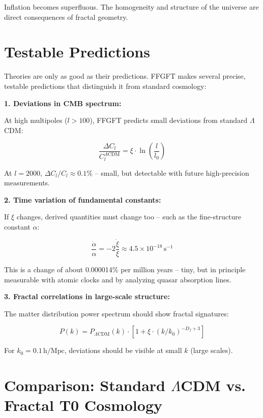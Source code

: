 \documentclass[12pt,a4paper]{article}
\begin{document}
Inflation becomes superfluous. The homogeneity and structure of the universe are direct consequences of fractal geometry.

\section{Testable Predictions}

Theories are only as good as their predictions. FFGFT makes several precise, testable predictions that distinguish it from standard cosmology:

\textbf{1. Deviations in CMB spectrum:}

At high multipoles ($l > 100$), FFGFT predicts small deviations from standard $\Lambda$CDM:

\begin{equation}
\frac{\Delta C_l}{C_l^{\Lambda\text{CDM}}} = \xi \cdot \ln\left(\frac{l}{l_0}\right)
\end{equation}

At $l = 2000$, $\Delta C_l/C_l \approx 0.1\%$ -- small, but detectable with future high-precision measurements.

\textbf{2. Time variation of fundamental constants:}

If $\xi$ changes, derived quantities must change too -- such as the fine-structure constant $\alpha$:

\begin{equation}
\frac{\dot{\alpha}}{\alpha} = -2 \frac{\dot{\xi}}{\xi} \approx 4.5 \times 10^{-18} \, \text{s}^{-1}
\end{equation}

This is a change of about 0.000014\% per million years -- tiny, but in principle measurable with atomic clocks and by analyzing quasar absorption lines.

\textbf{3. Fractal correlations in large-scale structure:}

The matter distribution power spectrum should show fractal signatures:

\begin{equation}
P(k) = P_{\Lambda\text{CDM}}(k) \cdot \left[1 + \xi \cdot (k/k_0)^{-D_f+3}\right]
\end{equation}

For $k_0 = 0.1 \, \text{h/Mpc}$, deviations should be visible at small $k$ (large scales).

\section{Comparison: Standard $\Lambda$CDM vs. Fractal T0 Cosmology}
\end{document}
